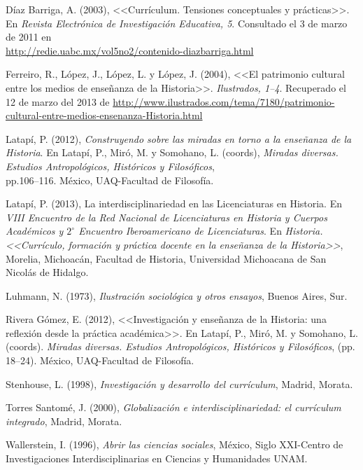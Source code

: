 Díaz Barriga, A. (2003), <<Currículum. Tensiones conceptuales y prácticas>>. En 
\textit{Revista Electrónica de Investigación Educativa, 5}. Consultado el 3 de marzo de 2011 en \\
\url{http://redie.uabc.mx/vol5no2/contenido-diazbarriga.html}

\begin{sloppypar}
Ferreiro, R., López, J., López, L. y López, J. (2004), <<El patrimonio cultural entre los medios de enseñanza de la Historia>>. \textit{Ilustrados, 1--4}. Recuperado el 12 de marzo del 2013 de \url{http://www.ilustrados.com/tema/7180/patrimonio-cultural-entre-medios-ensenanza-Historia.html}
\end{sloppypar}

Latapí, P. (2012), \textit{Construyendo sobre las miradas en torno a la enseñanza de 
la Historia}. En Latapí, P., Miró, M. y Somohano, L. (coords), \textit{Miradas diversas. Estudios Antropológicos, Históricos y Filosóficos},\\ pp.106--116. México, UAQ-Facultad de Filosofía.  

Latapí, P. (2013), La interdisciplinariedad en las Licenciaturas en Historia. En \textit{VIII Encuentro de la Red Nacional de Licenciaturas en Historia y  Cuerpos Académicos y $2^\circ$  Encuentro Iberoamericano de Licenciaturas}. En \textit{Historia. <<Currículo, formación y práctica docente en la enseñanza de la Historia>>}, Morelia, Michoacán, Facultad de Historia, Universidad Michoacana de San Nicolás de Hidalgo.

Luhmann, N. (1973), \textit{Ilustración sociológica y otros ensayos}, Buenos Aires, Sur.

Rivera Gómez, E. (2012), <<Investigación y enseñanza de la Historia: una reflexión desde la práctica académica>>. En Latapí, P., Miró, M. y Somohano, L. (coords). \textit{Miradas diversas. Estudios Antropológicos, Históricos y Filosóficos}, (pp. 18--24). México, UAQ-Facultad de Filosofía.  

Stenhouse, L. (1998), \textit{Investigación y desarrollo del currículum}, Madrid, Morata.

Torres Santomé, J. (2000),  \textit{Globalización e interdisciplinariedad: el currículum integrado}, Madrid, Morata.

\begin{sloppypar}
Wallerstein, I\@. (1996), \textit{Abrir las ciencias sociales}, México, Siglo XXI-Centro de Investigaciones Interdisciplinarias en Ciencias y Humanidades UNAM\@.
\end{sloppypar}

